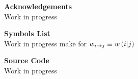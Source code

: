 \thispagestyle{empty}
\clearpage

\begin{center}
    \textbf{\Large{Acknowledgements}}\\ \vspace{0.6cm}
    Work in progress
\end{center}
\thispagestyle{empty}
\clearpage

\tableofcontents
\thispagestyle{empty}
\clearpage

\thispagestyle{empty}
\clearpage

\begin{center}
    \textbf{\Large{Symbols List}}\\ \vspace{0.6cm}
    Work in progress
    make for $w_{i\rightarrow j} \equiv w\left(i|j\right)$
\end{center}
\thispagestyle{empty}
\clearpage

\begin{center}
    \textbf{\Large{Source Code}}\\ \vspace{0.6cm}
    Work in progress
\end{center}
\thispagestyle{empty}
\clearpage
